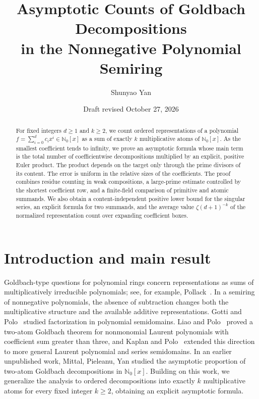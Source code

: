 \documentclass[11pt]{amsart}
\title[Asymptotic Goldbach counts]{Asymptotic Counts of Goldbach Decompositions\\
in the Nonnegative Polynomial Semiring}
\author{Shunyao Yan}
\date{Draft revised October 27, 2026}
\newcommand{\Nzero}{\mathbb N_0}
\theoremstyle{definition}
\theoremstyle{remark}
\begin{document}
\begin{abstract}
For fixed integers $d\ge1$ and $k\ge2$, we count ordered representations
of a polynomial $f=\sum_{i=0}^d c_i x^i\in\Nzero[x]$ as a sum of
exactly $k$ multiplicative atoms of $\Nzero[x]$. As the smallest
coefficient tends to infinity, we prove an asymptotic formula whose
main term is the total number of coefficientwise decompositions
multiplied by an explicit, positive Euler product. The product depends
on the target only through the prime divisors of its content. The error
is uniform in the relative sizes of the coefficients. The proof combines
residue counting in weak compositions, a large-prime estimate controlled
by the shortest coefficient row, and a finite-field comparison of
primitive and atomic summands. We also obtain a content-independent
positive lower bound for the singular series, an explicit formula for
two summands, and the average value $\zeta(d+1)^{-k}$ of the normalized
representation count over expanding coefficient boxes.
\end{abstract}

\maketitle

\section{Introduction and main result}\label{sec:introduction}

Goldbach-type questions for polynomial rings concern representations as
sums of multiplicatively irreducible polynomials; see, for example,
Pollack~\cite{Pollack}. In a semiring of nonnegative polynomials, the
absence of subtraction changes both the multiplicative structure and
the available additive representations. Gotti and Polo~\cite{GottiPolo}
studied factorization in polynomial semidomains. Liao and
Polo~\cite{LiaoPolo} proved a two-atom Goldbach theorem for nonmonomial
Laurent polynomials with coefficient sum greater than three, and Kaplan
and Polo~\cite{KaplanPolo} extended this direction to more general
Laurent polynomial and series semidomains. In an earlier unpublished work, Mittal, Pieleanu, Yan studied the asymptotic proportion of two-atom Goldbach decompositions in $\Nzero[x]$. Building on this work, we generalize the analysis to ordered decompositions into exactly $k$ multiplicative atoms for every fixed integer $k\ge2$, obtaining an explicit asymptotic formula.
\end{document}
